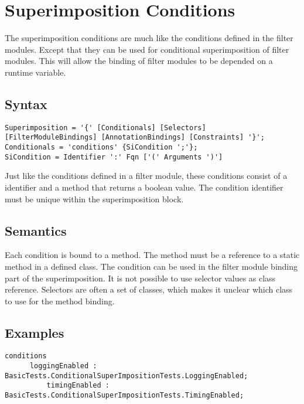 \chapter{Superimposition Conditions}\label{cha:Superimposition_Conditions}

The superimposition conditions are much like the conditions defined in the filter modules.
Except that they can be used for conditional superimposition of filter modules.
This will allow the binding of filter modules to be depended on a runtime variable.

\section{Syntax}

\begin{lstlisting}[caption={Superimposition Conditions Syntax}, label=lst::ARM:sicond:syntax, style=listing, language=ebnf, float=tpb]
Superimposition = '{' [Conditionals] [Selectors] [FilterModuleBindings] [AnnotationBindings] [Constraints] '}';
Conditionals = 'conditions' {SiCondition ';'};
SiCondition = Identifier ':' Fqn ['(' Arguments ')']
\end{lstlisting}

Just like the conditions defined in a filter module, these conditions consist of a identifier and a method that returns a boolean value.
The condition identifier must be unique within the superimposition block.

\section{Semantics}

Each condition is bound to a method.
The method must be a reference to a static method in a defined class.
The condition can be used in the filter module binding part of the superimposition.
It is not possible to use selector values as class reference.
Selectors are often a set of classes, which makes it unclear which class to use for the method binding.

\section{Examples}

\begin{lstlisting}[caption={Some condition examples}, label = lst::ARM:sicond:example1, style=listing, language =ComposeStar, float = tpb]
conditions
      loggingEnabled : BasicTests.ConditionalSuperImpositionTests.LoggingEnabled;
		  timingEnabled : BasicTests.ConditionalSuperImpositionTests.TimingEnabled;
\end{lstlisting}

